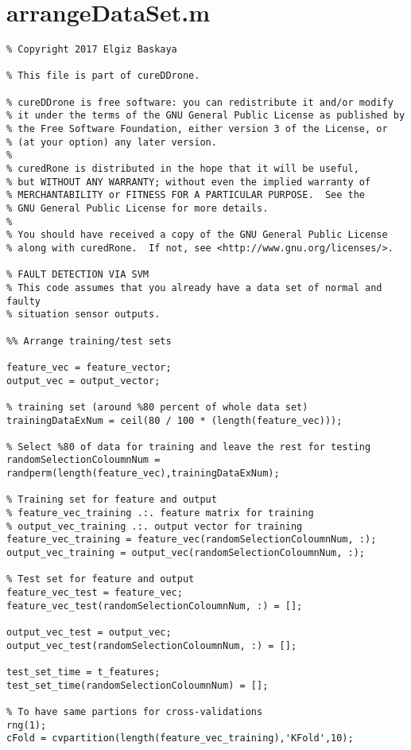 \section{arrangeDataSet.m}
\begin{lstlisting}
% Copyright 2017 Elgiz Baskaya

% This file is part of cureDDrone.

% cureDDrone is free software: you can redistribute it and/or modify
% it under the terms of the GNU General Public License as published by
% the Free Software Foundation, either version 3 of the License, or
% (at your option) any later version.
% 
% curedRone is distributed in the hope that it will be useful,
% but WITHOUT ANY WARRANTY; without even the implied warranty of
% MERCHANTABILITY or FITNESS FOR A PARTICULAR PURPOSE.  See the
% GNU General Public License for more details.
% 
% You should have received a copy of the GNU General Public License
% along with curedRone.  If not, see <http://www.gnu.org/licenses/>.

% FAULT DETECTION VIA SVM
% This code assumes that you already have a data set of normal and faulty 
% situation sensor outputs.

%% Arrange training/test sets

feature_vec = feature_vector;
output_vec = output_vector;

% training set (around %80 percent of whole data set)
trainingDataExNum = ceil(80 / 100 * (length(feature_vec)));

% Select %80 of data for training and leave the rest for testing
randomSelectionColoumnNum = randperm(length(feature_vec),trainingDataExNum);

% Training set for feature and output
% feature_vec_training .:. feature matrix for training
% output_vec_training .:. output vector for training
feature_vec_training = feature_vec(randomSelectionColoumnNum, :);
output_vec_training = output_vec(randomSelectionColoumnNum, :);

% Test set for feature and output
feature_vec_test = feature_vec;
feature_vec_test(randomSelectionColoumnNum, :) = [];

output_vec_test = output_vec;
output_vec_test(randomSelectionColoumnNum, :) = [];

test_set_time = t_features;
test_set_time(randomSelectionColoumnNum) = [];

% To have same partions for cross-validations 
rng(1);
cFold = cvpartition(length(feature_vec_training),'KFold',10);
 \end{lstlisting}

